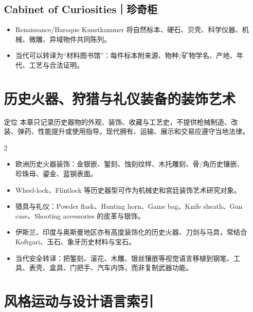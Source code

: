 \documentclass[lang=en,a4paper,11pt]{elegantpaper}
\begin{document}
\subsection{Cabinet of Curiosities｜珍奇柜}
\begin{itemize}
\item Renaissance/Baroque Kunstkammer 将自然标本、硬石、贝壳、科学仪器、机械、微雕、异域物件共同陈列。
\item 当代可以转译为“材料图书馆”：每件标本附来源、物种/矿物学名、产地、年代、工艺与合法证明。
\end{itemize}

\section{历史火器、狩猎与礼仪装备的装饰艺术}
\begin{legalbox}{定位}
本章只记录历史器物的外观、装饰、收藏与工艺史，不提供枪械制造、改装、弹药、性能提升或使用指导。现代拥有、运输、展示和交易应遵守当地法律。
\end{legalbox}
\begin{multicols}{2}\begin{itemize}
\item 欧洲历史火器装饰：金银嵌、錾刻、蚀刻纹样、木托雕刻、骨/角历史镶嵌、珍珠母、鎏金、蓝钢表面。
\item Wheel-lock、Flintlock 等历史器型可作为机械史和宫廷装饰艺术研究对象。
\item 猎具与礼仪：Powder flask、Hunting horn、Game bag、Knife sheath、Gun case、Shooting accessories 的皮革与银饰。
\item 伊斯兰、印度与奥斯曼地区亦有高度装饰化的历史火器、刀剑与马具，常结合 Koftgari、玉石、象牙历史材料与宝石。
\item 当代安全转译：把錾刻、滚花、木雕、银丝镶嵌等视觉语言移植到钢笔、工具、表壳、盒具、门把手、汽车内饰，而非复制武器功能。
\end{itemize}\end{multicols}

\section{风格运动与设计语言索引}
\end{document}
